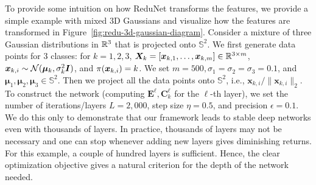 \documentclass[\toplevelprefix/book-main.tex]{subfiles}
\begin{document}
\begin{example}
To provide some intuition on how ReduNet transforms the features, we provide a simple example with mixed 3D Gaussians and visualize how the features are transformed in Figure~\ref{fig:redu-3d-gaussian-diagram}. 
Consider a mixture of three Gaussian distributions in $\mathbb{R}^{3}$ that is projected onto $\mathbb{S}^2$. We first generate data points for 3 classes: for $k=1,2,3$, $\bm{X}_{k}=[\bm{x}_{k,1}, \ldots, \bm{x}_{k,m}] \in \mathbb{R}^{3\times m}$, $\bm{x}_{k,i} \sim \mathcal{N}(\bm{\mu}_{k}, \sigma_{k}^{2} \bm{I})$, and ${\pi}(\bm{x}_{k,i}) = k$.
We set $m=500, \sigma_{1}=\sigma_{2}=\sigma_{3}=0.1$, and $\bm{\mu}_{1}, \bm{\mu}_{2}, \bm{\mu}_{3} \in \mathbb{S}^2$. 
Then we project all the data points onto $\mathbb{S}^{2}$, i.e., $\bm{x}_{k,i}/\|\bm{x}_{k,i}\|_{2}$. 
To construct the network (computing $\bm{E}^{\ell}, \bm{C}^{\ell}_{k}$ for the $\ell$-th layer), we set the number of iterations/layers $L=2,000$, step size $\eta=0.5$, and precision $\epsilon=0.1$. 
We do this only to demonstrate that our framework leads to stable deep networks even with thousands of layers. 
In practice, thousands of layers may not be necessary and one can stop whenever adding new layers gives diminishing returns. 
For this example, a couple of hundred layers is sufficient. Hence, the clear optimization objective gives a natural criterion for the depth of the network needed.


\end{example}
\end{document}
